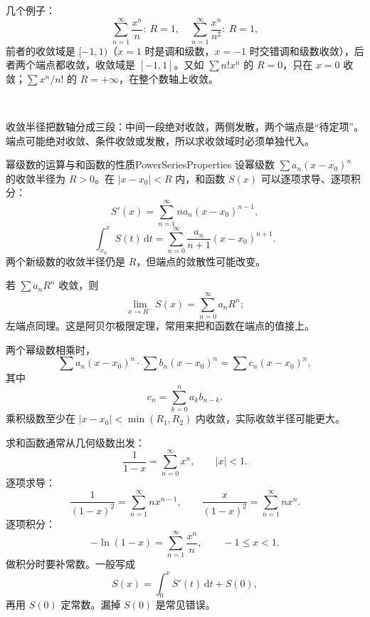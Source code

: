 几个例子：
\[
\sum_{n=1}^{\infty}\frac{x^n}{n}:\ R=1,\quad
\sum_{n=1}^{\infty}\frac{x^n}{n^2}:\ R=1,
\]
前者的收敛域是 $[-1,1)$（$x=1$ 时是调和级数，$x=-1$ 时交错调和级数收敛），后者两个端点都收敛，收敛域是 $[-1,1]$。又如 $\sum n!x^n$ 的 $R=0$，只在 $x=0$ 收敛；$\sum x^n/n!$ 的 $R=+\infty$，在整个数轴上收敛。

\noindent\begin{minipage}{\linewidth}
\centering
{}\\[2pt]
{\footnotesize\parbox{\dimexpr\linewidth-2em\relax}{\centering 收敛半径把数轴分成三段：中间一段绝对收敛，两侧发散，两个端点是“待定项”。端点可能绝对收敛、条件收敛或发散，所以求收敛域时必须单独代入。}}
\end{minipage}

\begin{conclusion}{幂级数的运算与和函数的性质}{PowerSeriesProperties}
    设幂级数 $\sum a_n(x-x_0)^n$ 的收敛半径为 $R>0$。在 $|x-x_0|<R$ 内，和函数 $S(x)$ 可以逐项求导、逐项积分：
    \[
        S'(x)=\sum_{n=1}^{\infty}na_n(x-x_0)^{n-1},
    \]
    \[
        \int_{x_0}^{x}S(t)\,\mathrm dt
        =\sum_{n=0}^{\infty}\frac{a_n}{n+1}(x-x_0)^{n+1}.
    \]
    两个新级数的收敛半径仍是 $R$，但端点的敛散性可能改变。

    若 $\sum a_nR^n$ 收敛，则
    \[
        \lim_{x\to R^-}S(x)=\sum_{n=0}^{\infty}a_nR^n;
    \]
    左端点同理。这是阿贝尔极限定理，常用来把和函数在端点的值接上。

    两个幂级数相乘时，
    \[
        \sum a_n(x-x_0)^n\cdot\sum b_n(x-x_0)^n
        =\sum c_n(x-x_0)^n,
    \]
    其中
    \[
        c_n=\sum_{k=0}^{n}a_kb_{n-k}.
    \]
    乘积级数至少在 $|x-x_0|<\min(R_1,R_2)$ 内收敛，实际收敛半径可能更大。
\end{conclusion}

求和函数通常从几何级数出发：
\[
\frac1{1-x}=\sum_{n=0}^{\infty}x^n,\qquad |x|<1.
\]
逐项求导：
\[
\frac1{(1-x)^2}=\sum_{n=1}^{\infty}nx^{n-1},
\qquad
\frac{x}{(1-x)^2}=\sum_{n=1}^{\infty}nx^n.
\]
逐项积分：
\[
-\ln(1-x)=\sum_{n=1}^{\infty}\frac{x^n}{n},\qquad -1\le x<1.
\]
做积分时要补常数。一般写成
\[
S(x)=\int_0^x S'(t)\,\mathrm dt+S(0),
\]
再用 $S(0)$ 定常数。漏掉 $S(0)$ 是常见错误。

